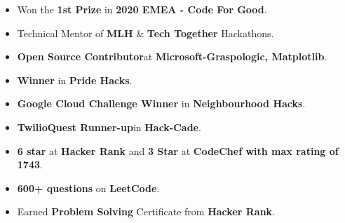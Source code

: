 \begin{itemize}
\item Won the \textbf{1st Prize} in \textbf{2020 EMEA - Code For Good}.
\item Technical Mentor of \textbf{MLH} \& \textbf{Tech Together} Hackathons.
\item \textbf{Open Source Contributor}at \textbf{Microsoft-Graspologic, Matplotlib}.
\item \textbf{Winner} in \textbf{Pride Hacks}.
\item \textbf{Google Cloud Challenge Winner} in \textbf{Neighbourhood Hacks}.
\item \textbf{TwilioQuest Runner-up}in \textbf{Hack-Cade}.
\item 	\textbf{6 star} at \textbf{Hacker Rank} and  \textbf{3 Star} at \textbf{CodeChef with max rating of 1743}.
\item  \textbf{600+ questions} on \textbf{LeetCode}.
\item Earned \textbf{Problem Solving} Certificate from \textbf{Hacker Rank}.
\end{itemize}


